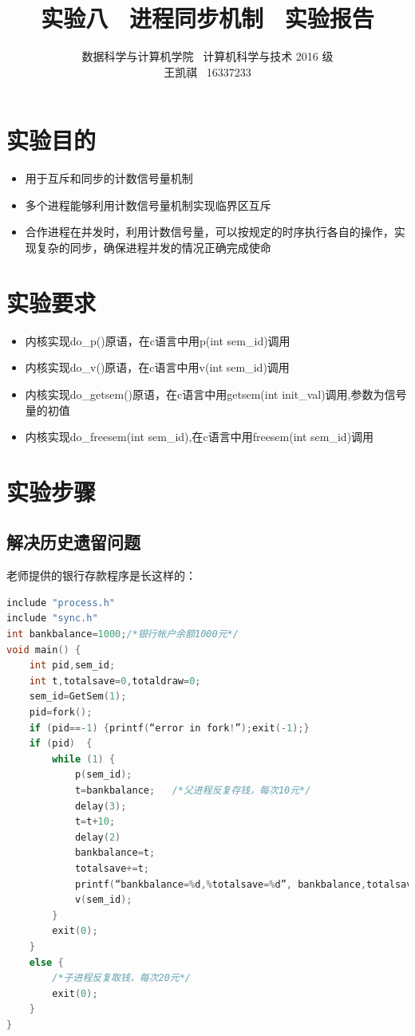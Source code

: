 \documentclass[a4paper]{article}
\begin{document}
\title{实验八 \ 进程同步机制 \ 实验报告}
\author {数据科学与计算机学院 \ 计算机科学与技术 2016 级 \\ 王凯祺 \ 16337233}
\maketitle

\section{实验目的}

\begin{itemize}
\item 用于互斥和同步的计数信号量机制
\item 多个进程能够利用计数信号量机制实现临界区互斥
\item 合作进程在并发时，利用计数信号量，可以按规定的时序执行各自的操作，实现复杂的同步，确保进程并发的情况正确完成使命
\end{itemize}

\section{实验要求}

\begin{itemize}
\item 内核实现do\_p()原语，在c语言中用p(int sem\_id)调用 
\item 内核实现do\_v()原语，在c语言中用v(int sem\_id)调用
\item 内核实现do\_getsem()原语，在c语言中用getsem(int init\_val)调用,参数为信号量的初值
\item 内核实现do\_freesem(int sem\_id),在c语言中用freesem(int sem\_id)调用
\end{itemize}

\section{实验步骤}

\subsection{解决历史遗留问题}

老师提供的银行存款程序是长这样的：

\begin{lstlisting}[language=C]
include "process.h"
include "sync.h"
int bankbalance=1000;/*银行帐户余额1000元*/
void main() {
	int pid,sem_id;
	int t,totalsave=0,totaldraw=0;
	sem_id=GetSem(1);
	pid=fork();
	if (pid==-1) {printf(“error in fork!”);exit(-1);}
	if (pid)  {
		while (1) {
			p(sem_id);
			t=bankbalance;   /*父进程反复存钱，每次10元*/
			delay(3);
			t=t+10;
			delay(2)
			bankbalance=t; 
			totalsave+=t;
			printf(“bankbalance=%d,%totalsave=%d”, bankbalance,totalsave );
			v(sem_id);
		}
		exit(0);
	} 
	else {
		/*子进程反复取钱，每次20元*/
		exit(0);
	}
}
\end{lstlisting}
\end{document}
